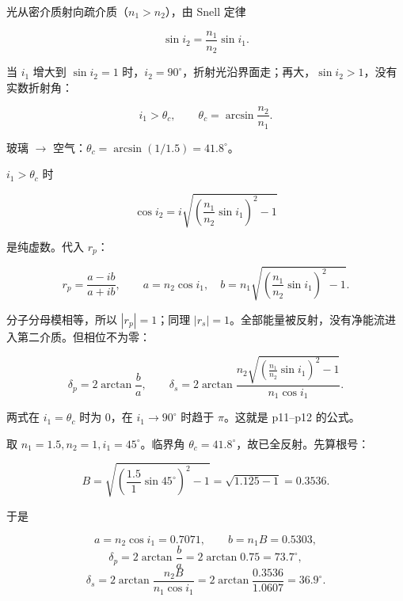 \documentclass[11pt]{ctexart}
\begin{document}



光从密介质射向疏介质（$n_1>n_2$），由 Snell 定律

\[
\sin i_2=\frac{n_1}{n_2}\sin i_1 .
\]

当 $i_1$ 增大到 $\sin i_2=1$ 时，$i_2=90^\circ$，折射光沿界面走；再大，$\sin i_2>1$，没有实数折射角：

\[
i_1>\theta_c,\qquad \theta_c=\arcsin\frac{n_2}{n_1}.
\]

玻璃 $\to$ 空气：$\theta_c=\arcsin(1/1.5)=41.8^\circ$。


$i_1>\theta_c$ 时

\[
\cos i_2=i\sqrt{\left(\frac{n_1}{n_2}\sin i_1\right)^2-1}
\]

是纯虚数。代入 $r_p$：

\[
r_p=\frac{a-ib}{a+ib},\qquad
a=n_2\cos i_1,\quad b=n_1\sqrt{\left(\frac{n_1}{n_2}\sin i_1\right)^2-1}.
\]

分子分母模相等，所以 $|r_p|=1$；同理 $|r_s|=1$。全部能量被反射，没有净能流进入第二介质。但相位不为零：

\[
\delta_p=2\arctan\frac{b}{a},\qquad
\delta_s=2\arctan\frac{n_2\sqrt{\left(\frac{n_1}{n_2}\sin i_1\right)^2-1}}{n_1\cos i_1}.
\]

两式在 $i_1=\theta_c$ 时为 $0$，在 $i_1\to90^\circ$ 时趋于 $\pi$。这就是 p11--p12 的公式。



取 $n_1=1.5,n_2=1,i_1=45^\circ$。临界角 $\theta_c=41.8^\circ$，故已全反射。先算根号：

\[
B=\sqrt{\left(\frac{1.5}{1}\sin45^\circ\right)^2-1}
=\sqrt{1.125-1}=0.3536 .
\]

于是

\[
a=n_2\cos i_1=0.7071,\qquad b=n_1B=0.5303,
\]
\[
\delta_p=2\arctan\frac{b}{a}=2\arctan0.75=73.7^\circ,
\]
\[
\delta_s=2\arctan\frac{n_2B}{n_1\cos i_1}
=2\arctan\frac{0.3536}{1.0607}=36.9^\circ .
\]
\end{document}
